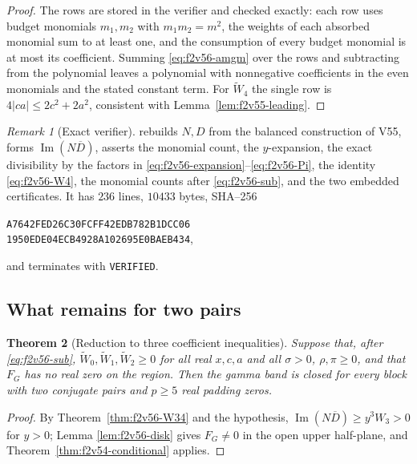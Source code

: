 \documentclass[11pt]{article}
\newtheorem{theorem}{Theorem}[section]
\theoremstyle{definition}
\theoremstyle{remark}
\newtheorem{remark}[theorem]{Remark}
\begin{document}
\begin{proof}
The rows are stored in the verifier and checked exactly: each row uses
budget monomials \(m_1,m_2\) with \(m_1m_2=m^2\), the weights of each
absorbed monomial sum to at least one, and the consumption of every
budget monomial is at most its coefficient.  Summing
\eqref{eq:f2v56-amgm} over the rows and subtracting from the polynomial
leaves a polynomial with nonnegative coefficients in the even monomials
and the stated constant term.  For \(\widetilde W_4\) the single row is
\(4|ca|\le2c^2+2a^2\), consistent with Lemma~\ref{lem:f2v55-leading}.
\end{proof}

\begin{remark}[Exact verifier]
\label{rem:f2v56-verifier}
 rebuilds
\(N,D\) from the balanced construction of V55, forms
\(\operatorname{Im}(N\overline D)\), asserts the monomial count, the
\(y\)-expansion, the exact divisibility by the factors in
\eqref{eq:f2v56-expansion}--\eqref{eq:f2v56-Pi}, the identity
\eqref{eq:f2v56-W4}, the monomial counts after
\eqref{eq:f2v56-sub}, and the two embedded certificates.  It has
\(236\) lines, \(10433\) bytes, SHA--256
\begin{center}
\texttt{A7642FED26C30FCFF42EDB782B1DCC06}\\
\texttt{1950EDE04ECB4928A102695E0BAEB434},
\end{center}
and terminates with \texttt{VERIFIED}.
\end{remark}

\subsection{What remains for two pairs}

\begin{theorem}[Reduction to three coefficient inequalities]
\label{thm:f2v56-reduction}
Suppose that, after \eqref{eq:f2v56-sub},
\(\widetilde W_0,\widetilde W_1,\widetilde W_2\ge0\) for all real
\(x,c,a\) and all \(\sigma>0\), \(\rho,\pi\ge0\), and that \(F_G\) has no
real zero on the region.  Then the gamma band is closed for every block
with two conjugate pairs and \(p\ge5\) real padding zeros.
\end{theorem}

\begin{proof}
By Theorem~\ref{thm:f2v56-W34} and the hypothesis,
\(\operatorname{Im}(N\overline D)\ge y^3W_3>0\) for \(y>0\); Lemma
\ref{lem:f2v56-disk} gives \(F_G\ne0\) in the open upper half-plane, and
Theorem~\ref{thm:f2v54-conditional} applies.
\end{proof}
\end{document}

